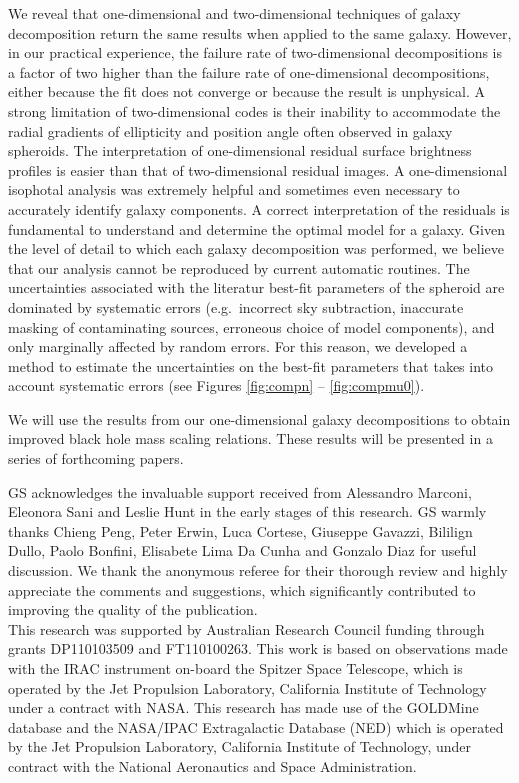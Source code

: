 \documentclass[preprint2]{emulateapj}
\begin{document}
We reveal that one-dimensional and two-dimensional techniques of galaxy decomposition return the same results when applied to the same galaxy.
However, in our practical experience, the failure rate of two-dimensional decompositions 
is a factor of two higher than the failure rate of one-dimensional decompositions,  
either because the fit does not converge or because the result is unphysical. 
A strong limitation of two-dimensional codes is their inability to accommodate the radial gradients of ellipticity and position angle 
often observed in galaxy spheroids.
The interpretation of one-dimensional residual surface brightness profiles is easier than that of two-dimensional residual images. 
A one-dimensional isophotal analysis was extremely helpful and sometimes even necessary to accurately identify galaxy components.
A correct interpretation of the residuals is fundamental to understand and determine the optimal model for a galaxy.
Given the level of detail to which each galaxy decomposition was performed, 
we believe that our analysis cannot be reproduced by current automatic routines. 
The uncertainties associated with the literatur best-fit parameters of the spheroid are dominated by systematic errors (e.g.~incorrect sky subtraction, 
inaccurate masking of contaminating sources, erroneous choice of model components), and only marginally affected by random errors. 
For this reason, we developed a method to estimate the uncertainties on the best-fit parameters that takes into account systematic errors 
(see Figures \ref{fig:compn} -- \ref{fig:compmu0}).

We will use the results from our one-dimensional galaxy decompositions to obtain improved black hole mass scaling relations. 
These results will be presented in a series of forthcoming papers.


\acknowledgments
GS acknowledges the invaluable support received from Alessandro Marconi, Eleonora Sani and Leslie Hunt 
in the early stages of this research.
GS warmly thanks Chieng Peng, Peter Erwin, Luca Cortese, Giuseppe Gavazzi, 
Bililign Dullo, Paolo Bonfini, Elisabete Lima Da Cunha 
and Gonzalo Diaz 
for useful discussion. 
We thank the anonymous referee for their thorough review and highly appreciate the comments and suggestions, 
which significantly contributed to improving the quality of the publication.  \\
This research was supported by Australian Research Council funding through grants
DP110103509 and FT110100263.
This work is based on observations made with the IRAC instrument \citep{fazio2004IRAC} 
on-board the Spitzer Space Telescope, 
which is operated by the Jet Propulsion Laboratory, 
California Institute of Technology under a contract with NASA.
This research has made use of the GOLDMine database \citep{goldmine} and the NASA/IPAC Extragalactic Database (NED) 
which is operated by the Jet Propulsion Laboratory, California Institute of Technology, 
under contract with the National Aeronautics and Space Administration. 
\end{document}
